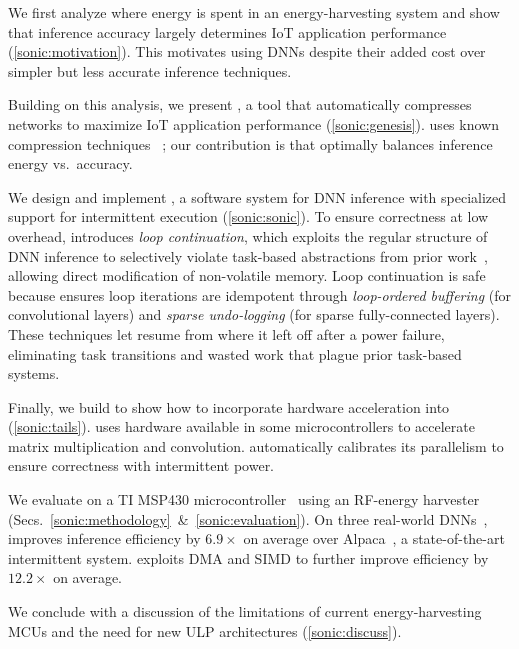 \begin{compactitem}
\item We first analyze where energy is spent in an energy-harvesting system
and show that inference accuracy largely determines IoT
application performance (\autoref{sonic:motivation}).
%
This motivates using DNNs despite their added cost over simpler but
less accurate inference techniques.
%
\item Building on this analysis, we present \genesis, a tool that
automatically compresses networks to maximize IoT application
performance (\autoref{sonic:genesis}).
%
\genesis uses known compression techniques%
~\cite{nabhan1994toward, han:iclr16:deep-compression,
  chollet2016xception, bhattacharya2016sparsification};
%
our contribution is that \genesis optimally balances inference energy
vs.\ accuracy. %
%
\item We design and implement \sonic, 
  a software system for DNN inference with specialized support for intermittent execution
  (\autoref{sonic:sonic}).
  To ensure correctness at low overhead,
  \sonic introduces \emph{loop continuation},
  which exploits the regular structure of DNN inference
  to selectively violate task-based abstractions from prior work~\cite{alpaca},
  allowing direct modification of non-volatile memory.
%
  Loop continuation is safe because
  \sonic ensures loop iterations are idempotent
  through \emph{loop-ordered buffering} (for convolutional layers) and \emph{sparse undo-logging} (for sparse fully-connected layers).
%
These techniques let \sonic resume from where it left off after a power failure,
{eliminating task transitions and wasted work} that plague prior task-based systems.
%
\item Finally, we build \tails to show how to incorporate hardware
  acceleration into \sonic (\autoref{sonic:tails}). \tails uses
  hardware available in some microcontrollers to accelerate matrix
  multiplication and convolution.
  \tails automatically calibrates its parallelism
  to ensure correctness with intermittent power.

\end{compactitem}

\noindent
We evaluate \sonictails on a TI MSP430
microcontroller~\cite{msp430fr5994} using an RF-energy
harvester~\cite{powercastboard,powercasttransmitter} (Secs.~\autoref{sonic:methodology}~\&~\autoref{sonic:evaluation}).
%
On three real-world DNNs~\cite{lecun:ieee89:lenet,okgoogle,har},
\sonic improves inference efficiency by $6.9\times$ on average
over Alpaca~\cite{alpaca}, a state-of-the-art intermittent system.
%
\tails exploits DMA and SIMD to further improve efficiency by $12.2\times$ on average.

We conclude with a discussion of the limitations of current energy-harvesting MCUs and the need for new ULP architectures (\autoref{sonic:discuss}).


